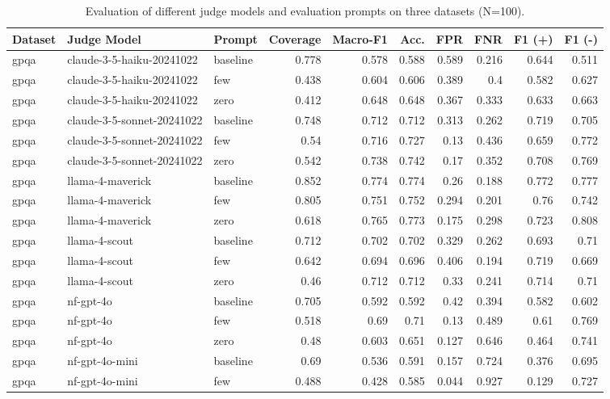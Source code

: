 \begin{table}[htbp]
\caption{Evaluation of different judge models and evaluation prompts on three datasets (N=100).}
\label{tab:expeval}
\begin{tabular}{lllrrrrrrr}
\toprule
Dataset & Judge Model & Prompt & Coverage & Macro-F1 & Acc. & FPR & FNR & F1 (+) & F1 (-) \\
\midrule
gpqa & claude-3-5-haiku-20241022 & baseline & 0.778 & 0.578 & 0.588 & 0.589 & 0.216 & 0.644 & 0.511 \\
gpqa & claude-3-5-haiku-20241022 & few & 0.438 & 0.604 & 0.606 & 0.389 & 0.4 & 0.582 & 0.627 \\
gpqa & claude-3-5-haiku-20241022 & zero & 0.412 & 0.648 & 0.648 & 0.367 & 0.333 & 0.633 & 0.663 \\
gpqa & claude-3-5-sonnet-20241022 & baseline & 0.748 & 0.712 & 0.712 & 0.313 & 0.262 & 0.719 & 0.705 \\
gpqa & claude-3-5-sonnet-20241022 & few & 0.54 & 0.716 & 0.727 & 0.13 & 0.436 & 0.659 & 0.772 \\
gpqa & claude-3-5-sonnet-20241022 & zero & 0.542 & 0.738 & 0.742 & 0.17 & 0.352 & 0.708 & 0.769 \\
gpqa & llama-4-maverick & baseline & 0.852 & 0.774 & 0.774 & 0.26 & 0.188 & 0.772 & 0.777 \\
gpqa & llama-4-maverick & few & 0.805 & 0.751 & 0.752 & 0.294 & 0.201 & 0.76 & 0.742 \\
gpqa & llama-4-maverick & zero & 0.618 & 0.765 & 0.773 & 0.175 & 0.298 & 0.723 & 0.808 \\
gpqa & llama-4-scout & baseline & 0.712 & 0.702 & 0.702 & 0.329 & 0.262 & 0.693 & 0.71 \\
gpqa & llama-4-scout & few & 0.642 & 0.694 & 0.696 & 0.406 & 0.194 & 0.719 & 0.669 \\
gpqa & llama-4-scout & zero & 0.46 & 0.712 & 0.712 & 0.33 & 0.241 & 0.714 & 0.71 \\
gpqa & nf-gpt-4o & baseline & 0.705 & 0.592 & 0.592 & 0.42 & 0.394 & 0.582 & 0.602 \\
gpqa & nf-gpt-4o & few & 0.518 & 0.69 & 0.71 & 0.13 & 0.489 & 0.61 & 0.769 \\
gpqa & nf-gpt-4o & zero & 0.48 & 0.603 & 0.651 & 0.127 & 0.646 & 0.464 & 0.741 \\
gpqa & nf-gpt-4o-mini & baseline & 0.69 & 0.536 & 0.591 & 0.157 & 0.724 & 0.376 & 0.695 \\
gpqa & nf-gpt-4o-mini & few & 0.488 & 0.428 & 0.585 & 0.044 & 0.927 & 0.129 & 0.727 \\

\end{tabular}
\end{table}
